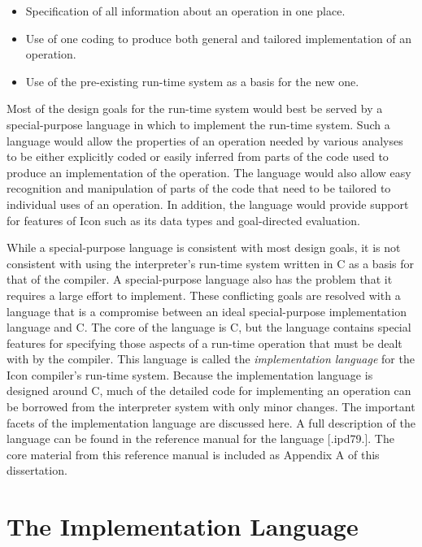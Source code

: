 \liststyleLxx
\begin{itemize}

\item Specification of all information about an operation in one place. 

\item Use of one coding to produce both general and tailored
implementation of an operation.

\item Use of the pre-existing run-time system as a basis for the new one. 

\end{itemize}

Most of the design goals for the run-time system would best be served
by a special-purpose language in which to implement the run-time
system. Such a language would allow the properties of an operation
needed by various analyses to be either explicitly coded or easily
inferred from parts of the code used to produce an implementation of
the operation. The language would also allow easy recognition and
manipulation of parts of the code that need to be tailored to
individual uses of an operation. In addition, the language would
provide support for features of Icon such as its data types and
goal-directed evaluation.

While a special-purpose language is consistent with most design goals,
it is not consistent with using the interpreter's run-time system
written in C as a basis for that of the compiler. A special-purpose
language also has the problem that it requires a large effort to
implement. These conflicting goals are resolved with a language that
is a compromise between an ideal special-purpose implementation
language and C. The core of the language is C, but the language
contains special features for specifying those aspects of a run-time
operation that must be dealt with by the compiler.  This language is
called the \textit{implementation language} for the Icon compiler's
run-time system. Because the implementation language is designed
around C, much of the detailed code for implementing an operation can
be borrowed from the interpreter system with only minor changes. The
important facets of the implementation language are discussed here. A
full description of the language can be found in the reference manual
for the language [.ipd79.]. The core material from this reference
manual is included as Appendix A of this dissertation.


\section{The Implementation Language}

